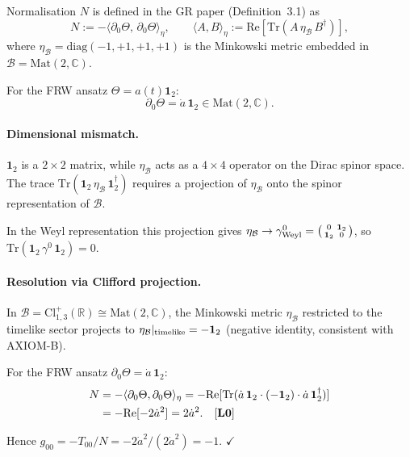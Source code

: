 \documentclass[12pt,a4paper]{article}
\begin{document}
\begin{openproblembox}
Normalisation $N$ is defined in the GR paper (Definition~3.1) as
\[
N := -\langle \partial_0\Theta,\,\partial_0\Theta\rangle_\eta,
\qquad
\langle A,B\rangle_\eta
:= \mathrm{Re}[\mathrm{Tr}(A\,\eta_{\mathcal{B}}\,B^\dagger)],
\]
where $\eta_{\mathcal{B}}=\mathrm{diag}(-1,+1,+1,+1)$ is the
Minkowski metric embedded in $\mathcal{B}=\mathrm{Mat}(2,\mathbb{C})$.

For the FRW ansatz $\Theta = a(t)\mathbf{1}_2$:
\[
\partial_0\Theta = \dot{a}\,\mathbf{1}_2 \in \mathrm{Mat}(2,\mathbb{C}).
\]

\paragraph{Dimensional mismatch.}
$\mathbf{1}_2$ is a $2\times2$ matrix, while $\eta_{\mathcal{B}}$
acts as a $4\times4$ operator on the Dirac spinor space.
The trace $\mathrm{Tr}(\mathbf{1}_2\,\eta_{\mathcal{B}}\,\mathbf{1}_2^\dagger)$
requires a projection of $\eta_{\mathcal{B}}$ onto the
spinor representation of $\mathcal{B}$.

In the Weyl representation this projection gives
$\eta_{\mathcal{B}} \to \gamma^0_{\rm Weyl} = \bigl(\begin{smallmatrix}0&\mathbf{1}_2\\\mathbf{1}_2&0\end{smallmatrix}\bigr)$,
so $\mathrm{Tr}(\mathbf{1}_2\,\gamma^0\,\mathbf{1}_2) = 0$.


\paragraph{Resolution via Clifford projection.}
In $\mathcal{B}=\mathrm{Cl}^+_{1,3}(\mathbb{R})\cong\mathrm{Mat}(2,\mathbb{C})$,
the Minkowski metric $\eta_{\mathcal{B}}$ restricted to the timelike
sector projects to $\eta_{\mathcal{B}}|_{\rm timelike} = -\mathbf{1}_2$
(negative identity, consistent with AXIOM-B).

For the FRW ansatz $\partial_0\Theta = \dot a\,\mathbf{1}_2$:
\begin{align}
N &= -\langle \partial_0\Theta,\partial_0\Theta\rangle_\eta
   = -\mathrm{Re}[\mathrm{Tr}(\dot a\,\mathbf{1}_2\cdot(-\mathbf{1}_2)
     \cdot\dot a\,\mathbf{1}_2^\dagger)] \notag\\
  &= -\mathrm{Re}[-2\dot a^2] = 2\dot a^2. \quad [\mathbf{L0}]
\end{align}

Hence $g_{00} = -T_{00}/N = -2\dot a^2/(2\dot a^2) = -1$. $\checkmark$


\end{openproblembox}
\end{document}
